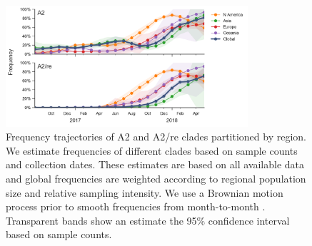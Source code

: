 \begin{figure}[b]
    \begin{center}
    \includegraphics[width=0.8\textwidth]{figures/h3n2_freq_mutations.png}
    \end{center}
    \caption{Frequency trajectories of A2 and A2/re clades partitioned by region. We estimate frequencies of different clades based on sample counts and collection dates. These estimates are based on all available data and global frequencies are weighted according to regional population size and relative sampling intensity. We use a Brownian motion process prior to smooth frequencies from month-to-month \citep{neher_nextflu_2015}. Transparent bands show an estimate the 95\% confidence interval based on sample counts.}
    \label{fig:frequencies}
\end{figure}


